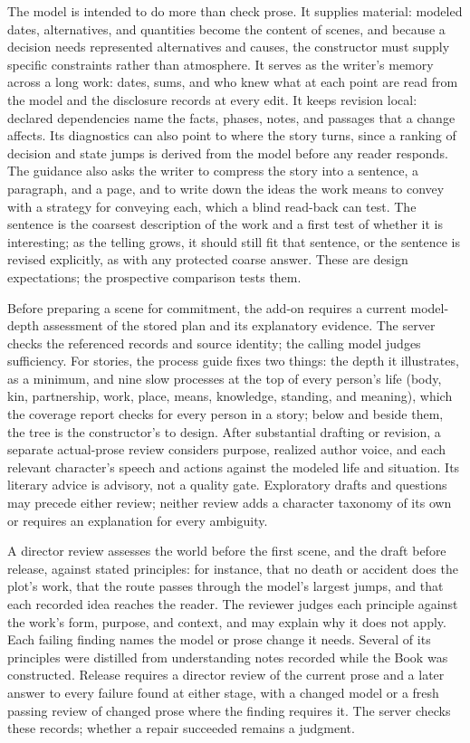 \documentclass[11pt,a4paper]{article}
\begin{document}
The model is intended to do more than check prose. It supplies material:
modeled dates, alternatives, and quantities become the content of scenes, and
because a decision needs represented alternatives and causes, the constructor
must supply specific constraints rather than atmosphere. It serves as the
writer's memory across a long work: dates, sums, and who knew what at each
point are read from the model and the disclosure records at every edit. It
keeps revision local: declared dependencies name the facts, phases, notes, and
passages that a change affects. Its diagnostics can also point to where the
story turns, since a ranking of decision and state jumps is derived from the
model before any reader responds. The guidance also asks the writer to compress
the story into a sentence, a paragraph, and a page, and to write down the ideas
the work means to convey with a strategy for conveying each, which a blind
read-back can test. The sentence
is the coarsest
description of the work and a first test of whether it is interesting; as the
telling grows, it should still fit that sentence, or the sentence is revised
explicitly, as with any protected coarse answer. These are design expectations;
the prospective comparison tests them.

Before preparing a scene for commitment, the add-on requires a current
model-depth assessment of the stored plan and its explanatory evidence.
The server checks the referenced records and source identity; the calling
model judges sufficiency. For stories, the process guide fixes two things: the depth
it illustrates, as a minimum, and nine slow processes at the top of every
person's life (body, kin, partnership, work, place, means, knowledge, standing,
and meaning), which the coverage report checks for every person in a story;
below and beside them, the tree is the constructor's to design. After
substantial drafting or revision, a separate
actual-prose review considers purpose, realized author voice, and each relevant
character's speech and actions against the modeled life and situation.
Its literary advice is advisory, not a quality gate. Exploratory drafts and
questions may precede either review; neither review adds a character taxonomy
of its own or requires an explanation for every ambiguity.

A director review assesses the world before the first scene, and the draft
before release, against stated principles: for instance, that no death or
accident does the plot's work, that the route passes through the model's
largest jumps, and that each recorded idea reaches the reader. The reviewer
judges each principle against the work's form, purpose, and context, and may
explain why it does not apply. Each failing finding names the model or prose
change it needs. Several of its principles
were distilled from understanding notes recorded while the Book was
constructed. Release requires a director
review of the current prose and a later answer to every failure found at either
stage, with a changed model or a fresh passing review of changed prose where the
finding requires it. The server checks these records; whether a repair
succeeded remains a judgment.
\end{document}
